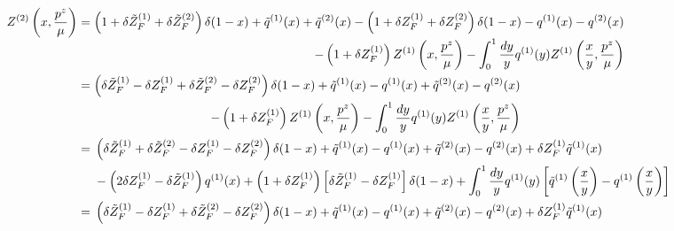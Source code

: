 \documentclass{article}
\begin{document}
\begin{align}
	Z^{(2)}\left(x, \frac{p^{z}}{\mu}\right) & =
	\begin{aligned}[t]
		\left(1+\delta \tilde{Z}_{F}^{(1)}+\delta \tilde{Z}_{F}^{(2)}\right) \delta(1-x)+\tilde{q}^{(1)}(x)+\tilde{q}^{(2)}(x)-\left(1+\delta Z_{F}^{(1)}+\delta Z_{F}^{(2)}\right) \delta(1-x)-q^{(1)}(x)-q^{(2)}(x)&\\-\left(1+\delta Z_{F}^{(1)}\right)Z^{(1)}\left(x, \frac{p^{z}}{\mu}\right)-\int_{0}^{1} \frac{d y}{y}q^{(1)}(y)Z^{(1)}\left(\frac{x}{y}, \frac{p^{z}}{\mu}\right)&
	\end{aligned}\NL
	                                         & =\begin{aligned}[t]
		\left(\delta \tilde{Z}_{F}^{(1)}-\delta Z_{F}^{(1)}+\delta \tilde{Z}_{F}^{(2)}-\delta Z_{F}^{(2)}\right) \delta(1-x)+\tilde{q}^{(1)}(x)-q^{(1)}(x)+\tilde{q}^{(2)}(x)-q^{(2)}(x)&\\-\left(1+\delta Z_{F}^{(1)}\right)Z^{(1)}\left(x, \frac{p^{z}}{\mu}\right)-\int_{0}^{1} \frac{d y}{y}q^{(1)}(y)Z^{(1)}\left(\frac{x}{y}, \frac{p^{z}}{\mu}\right)&
	\end{aligned}       \\
	                                         & =\begin{aligned}[t]
		                                                                                                                                                                                                                                                                                                        & \left(\delta \tilde{Z}_{F}^{(1)}+\delta \tilde{Z}_{F}^{(2)}-\delta Z_{F}^{(1)}-\delta Z_{F}^{(2)}\right) \delta(1-x)+\tilde{q}^{(1)}(x)-q^{(1)}(x)+\tilde{q}^{(2)}(x)-q^{(2)}(x)+\delta Z_{F}^{(1)}\tilde{q}^{(1)}(x) \\&
		-\left(2\delta Z_{F}^{(1)}-\delta \tilde{Z}_{F}^{(1)}\right)q^{(1)}(x)+\left(1+\delta Z_{F}^{(1)}\right)\left[\delta \tilde{Z}_{F}^{(1)}-\delta Z_{F}^{(1)}\right] \delta(1-x)+\int_{0}^{1} \frac{d y}{y}q^{(1)}(y)\left[\tilde{q}^{(1)}\left(\frac{x}{y}\right)-q^{(1)}\left(\frac{x}{y}\right)\right] &
	\end{aligned}\notag \\
	                                         & =\begin{aligned}[t]
		                                                                                                                                                                                                                                                                                                        & \left(\delta \tilde{Z}_{F}^{(1)}-\delta Z_{F}^{(1)}+\delta \tilde{Z}_{F}^{(2)}-\delta Z_{F}^{(2)}\right) \delta(1-x)+\tilde{q}^{(1)}(x)-q^{(1)}(x)+\tilde{q}^{(2)}(x)-q^{(2)}(x)+\delta Z_{F}^{(1)}\tilde{q}^{(1)}(x) \\&

\end{aligned}
\end{align}
\end{document}
